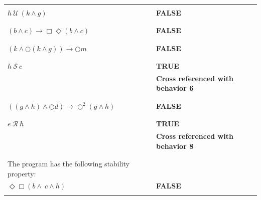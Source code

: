 \documentclass[12pt]{article}
\begin{document}
\begin{enumerate}
\begin{table}
\begin{tabular}{|l|l|}
\hline

&\\
		
$h ~\mathcal{U}~ (k \wedge g)$						
 &\textbf{FALSE}\\

&\\

\hline

&\\
		
$(b \wedge c) \rightarrow \Box \Diamond (b \wedge c)$ 
 &\textbf{FALSE}\\
&\\

\hline

&\\
		
$(k \wedge \bigcirc (k \wedge g)) \rightarrow \bigcirc m$ 
 &\textbf{FALSE}\\
&\\

\hline

&\\
		
$ h ~\mathcal{S}~ c$							
 &\textbf{TRUE}\\
 &\textbf{Cross referenced with behavior 6}\\
&\\

\hline

&\\
		
$ ((g \wedge h) \wedge \bigcirc d) \rightarrow \bigcirc^{2} (g \wedge h)$
 &\textbf{FALSE}\\
&\\

\hline

&\\
		
$e ~\mathcal{R}~ h$								
 &\textbf{TRUE}\\
 &\textbf{Cross referenced with behavior 8}\\
&\\

\hline

&\\
		
The program has the following stability property: &\\
$\Diamond \Box (b \wedge \ c \wedge h)$		
 &\textbf{FALSE}\\
&\\

\hline


\end{tabular}
\end{table}
\end{enumerate}
\end{document}
